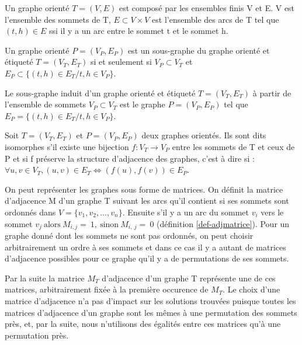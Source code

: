 \begin{defi}\label{def:graphe}
Un graphe orienté $T=(V, E)$ est composé par les ensembles finis V et E.
V est l'ensemble des sommets de T, $E\subset V\times V$ est l'ensemble des arcs de T tel que $(t, h)\in E$ ssi il y a un arc entre le sommet t et le sommet h.
\end{defi}

\begin{defi}\label{def:sousgraphe}
Un graphe orienté $P=(V_P, E_P)$ est un sous-graphe du graphe orienté et étiqueté $T=(V_T, E_T)$ si et seulement si $V_P \subset V_T$ et $E_P\subset\{(t, h)\in E_T / t, h \in V_P \}$.
\end{defi}

\begin{defi}\label{def:sousgraphe-induit}
Le sous-graphe induit d'un graphe orienté et étiqueté $T=(V_T, E_T)$ à partir de l'ensemble de sommets $V_P \subset V_T$ est le graphe $P=(V_P, E_P)$ tel que $E_P=\{(t, h)\in E_T / t, h \in V_P \}$.
\end{defi}

\begin{defi}\label{def:isog}
Soit $T=(V_T, E_T)$ et $P=(V_P, E_P)$ deux graphes orientés. Ils sont dits isomorphes s'il existe une bijection $f:V_T\rightarrow V_P$ entre les sommets de T et ceux de P et si f préserve la structure d'adjacence des graphes, c'est à dire si : $\forall u, v \in V_T, (u, v) \in E_T \Leftrightarrow (f(u), f(v)) \in E_P$.
\end{defi}

On peut représenter les graphes sous forme de matrices. On définit la matrice d'adjacence M d'un graphe T suivant les arcs qu'il contient si ses sommets sont ordonnés dans $V=\{v_1, v_2, ..., v_n\}$. Ensuite s'il y a un arc du sommet $v_i$ vers le sommet
$v_j~\mbox{alors}~M_{i, j}=~1,~\mbox{sinon}~M_{i,~j}=~0$ (définition \ref{def-adjmatrice}).
Pour un graphe donné dont les sommets ne sont pas ordonnés, on peut choisir arbitrairement un ordre à ses sommets et dans ce cas il y a autant de matrices d'adjacence possibles pour ce graphe qu'il y a de permutations de ses sommets. 

Par la suite la matrice $M_T$ d'adjacence d'un graphe T représente une de ces matrices, arbitrairement fixée à la première occurence de $M_T$.
Le choix d'une matrice d'adjacence n'a pas d'impact sur les solutions trouvées puisque toutes les matrices d'adjacence d'un graphe sont les mêmes à une permutation des sommets près, et, par la suite, nous n'utilisons des égalités entre ces matrices qu'à une permutation près.

